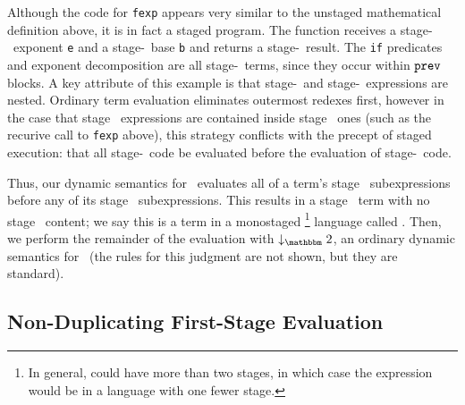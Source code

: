Although the code for {\tt fexp} appears very similar to the unstaged mathematical
definition above, it is in fact a staged program. The function receives a stage-\bbone\ exponent {\tt e} and a stage-\bbtwo\ base {\tt b} and returns a stage-\bbtwo\ result. The {\tt if} predicates and exponent
decomposition are all stage-\bbone\ terms, since they occur within ${\tt prev}$ blocks.
%
%
%
A key attribute of this example is that stage-\bbone\ and stage-\bbtwo\ expressions are nested. Ordinary term evaluation eliminates outermost redexes first, 
however in the case that stage \bbone\ expressions are contained inside
stage \bbtwo\ ones (such as the recurive call to {\tt fexp} above), this strategy conflicts with the precept of staged execution: that all stage-\bbone\ code be evaluated before the evaluation of stage-\bbtwo\ code. 

Thus, our dynamic semantics for \lang\ evaluates all of a term's stage \bbone\
subexpressions before any of its stage \bbtwo\ subexpressions. This results in a
stage \bbtwo\ term with no stage \bbone\ content; we say this is a term in a
monostaged
\footnote{In general, \lang could have more than two stages, in which case the
expression would be in a language with one fewer stage.}
language called \langTwo. Then, we perform the remainder of the evaluation with 
$\tworedsym$, an ordinary dynamic semantics for \langTwo\ (the rules for this
judgment are not shown, but they are standard).

\subsection{Non-Duplicating First-Stage Evaluation}

